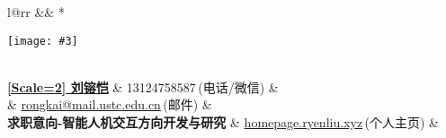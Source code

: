 \newcommand{\paint}[3]{
    \begin{minipage}{#1}
        \texttt{[image: \#3]}
    \end{minipage} 
}
\newcommand{\myheader}{
\begin{tabular*}{\textwidth}{l@{\extracolsep{\fill}}rr}
  && \multirow{4}*{\paint{2.5cm}{3cm}{./image.jpg}}\\
  \specialrule{0em}{0pt}{0pt}
  \textbf{\href{http://EricRongkai.github.io}{\CJKfontspec{微软雅黑}[Scale=2] 刘镕恺}} & 13124758587$\,${\color{labelgrey}(电话/微信)} &\\
   & \href{mailto:zhangzc@pku.edu.cn}{rongkai@mail.ustc.edu.cn}$\,${\color{labelgrey}(邮件)} & \\
   \textbf{求职意向-智能人机交互方向开发与研究} \quad& \href{https://homepage.ryenliu.xyz}{homepage.ryenliu.xyz}$\, ${\color{labelgrey}(个人主页)} & \\
  \end{tabular*}\\\vspace{0.1in}
}

\myheader

